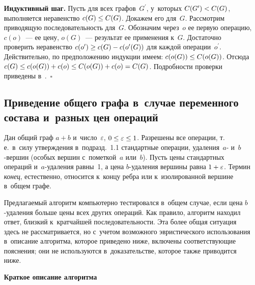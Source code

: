 \begin{multicols}{2}
  \textbf{Индуктивный шаг.} Пусть для всех графов~$G^\prime$, у~которых 
$C(G^\prime)\hm<C(G)$, выполняется неравенство $c(G)\hm\leq C(G)$. 
Докажем его для~$G$. Рассмотрим приводящую последовательность для~$G$. 
Обозначим через~$o$ ее первую операцию, $c(o)$~--- ее цену, $o(G)$~--- 
результат ее применения к~$G$. Достаточно проверить неравенство 
$c(o^\prime)\hm\geq c(G)\hm- c(o^\prime(G))$ для каждой операции~$o^\prime$. 
Действительно, по предположению индукции имеем: $c(o(G))\hm\leq C(o(G))$. 
Отсюда $c(G)\hm\leq c(o(G))\hm+ c(o) \hm\leq C(o(G))\hm +c(o)\hm= C(G)$. 
Подробности проверки приведены в~\cite[п.~3]{1-gor}.~$\square$

  
  \subsection{Приведение общего графа в~случае переменного состава 
и~разных цен операций}
  
   Дан общий граф $a+b$ и~число~$\varepsilon$, $0\hm\leq\varepsilon\hm\leq1$. 
Разрешены все операции, т.\,е.\ в~силу утверждения в~подразд.~1.1 стандартные 
операции, удаления~$a$- и~$b$-вер\-шин (особых вершин с~пометкой~$a$ 
или~$b$). Пусть цены стандартных операций и~$a$-уда\-ле\-ния равны~1, а цена 
$b$-уда\-ле\-ния вершины равна $1\hm+\varepsilon$. Термин \textit{конец}, 
естественно, относится к~концу реб\-ра или к~изолированной вершине в~общем 
графе. 
  
  Предлагаемый алгоритм компьютерно тестировался в~общем случае, если 
цена $b$-уда\-ле\-ния больше цены всех других операций. Как правило, 
алгоритм находил ответ, близкий к~кратчайшей последовательности. Эта более 
общая ситуация здесь не рассматривается, но с~учетом возможного 
эвристического использования в~описание алгоритма, которое приведено ниже, 
включены соответствующие пояснения; они не используются в~доказательстве, 
которое также приводится ниже. 
  
\pagebreak 
  
  \textbf{Краткое описание алгоритма}
  

\end{multicols}
